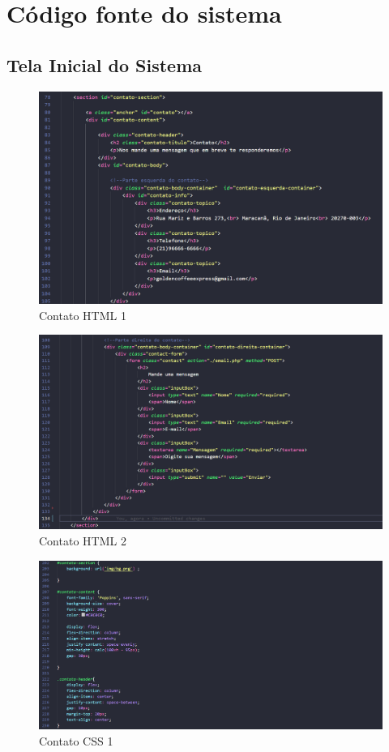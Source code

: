 
\chapter{Código fonte do sistema}
\section{Tela Inicial do Sistema}
\begin{figure}[!h]
	\centering
	\includegraphics[width=15cm]{Contato HTML 1}
	\caption{Contato HTML 1}
\end{figure}

\begin{figure}[!h]
	\centering
	\includegraphics[width=15cm]{Contato HTML 2}
	\caption{Contato HTML 2}
\end{figure}

\begin{figure}[!h]
	\centering
	\includegraphics[width=15cm]{Contato CSS 1}
	\caption{Contato CSS 1}
\end{figure}

